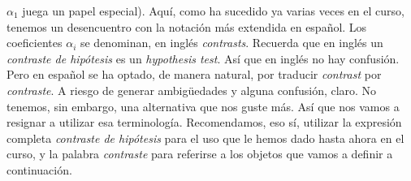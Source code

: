 $\alpha_1$ juega un papel especial). Aquí, como ha sucedido ya varias veces en el curso,
tenemos un desencuentro con la notación más extendida en español. Los coeficientes $\alpha_i$ se
denominan, en inglés {\em contrasts}. Recuerda que en inglés un {\em
contraste de hipótesis} es un {\em  hypothesis test}. Así que en inglés no hay confusión. Pero en
español se ha optado, de manera natural, por traducir {\em contrast} por {\em contraste}. A riesgo
de generar ambigüedades y alguna confusión, claro. No tenemos, sin embargo, una alternativa que nos
guste más. Así que nos vamos a resignar a utilizar esa terminología. Recomendamos, eso sí, utilizar
la expresión completa {\em contraste de hipótesis} para el uso que le hemos dado hasta ahora en el
curso, y la palabra {\em contraste} para referirse a los objetos que vamos a definir a
continuación.\\

    \\[3mm]

